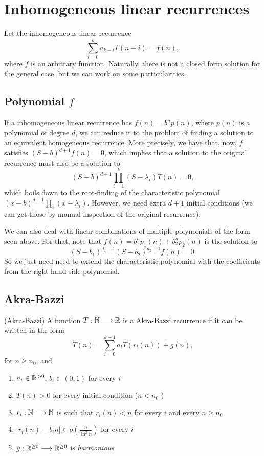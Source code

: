 \section*{Inhomogeneous linear recurrences}

Let the inhomogeneous linear recurrence \[
\sum_{i=0}^{k} a_{k-i}T(n-i) = f(n)
,\] where $f$ is an arbitrary function.
Naturally, there is not a closed form solution for the general case, but we can work on some particularities.

\subsection*{Polynomial $f$}

If a inhomogeneous linear recurrence has $f(n) = b^{n}p(n)$, where $p(n)$ is a polynomial of degree $d$, we can reduce it to the problem of finding a solution to an equivalent homogeneous recurrence.
More precisely, we have that, now, $f$ satisfies $(S-b)^{d+1}f(n) = 0$, which implies that a solution to the original recurrence must also be a solution to \[
    (S-b)^{d+1} \prod_{i=1}^{k} (S-\lambda_i) T(n) = 0 
,\] which boils down to the root-finding of the characteristic polynomial $(x-b)^{d+1} \prod_{i} (x-\lambda_i)$.
However, we need extra $d+1$ initial conditions (we can get those by manual inspection of the original recurrence).

\begin{note}
    We can also deal with linear combinations of multiple polynomials of the form seen above.
    For that, note that $f(n) = b_1^{n}p_1(n) + b_2^{n}p_2(n)$ is the solution to \[
	(S-b_1)^{d_1+1}(S-b_2)^{d_2+1}f(n) = 0
    .\] So we just need need to extend the characteristic polynomial with the coefficients from the right-hand side polynomial.
\end{note}

\subsection*{Akra-Bazzi}


\begin{definition}
    (Akra-Bazzi) A function $T: \mathbb{N} \longrightarrow \mathbb{R}$ is a Akra-Bazzi recurrence if it can be written in the form \[
    T(n) = \sum_{i=0}^{k-1} a_i T(r_i(n)) + g(n)
    ,\] for $n\ge n_0$, and
    \begin{enumerate}
        \item $a_i \in \mathbb{R}^{> 0}$, $b_i\in (0,1)$ for every $i$ 
	\item $T(n) > 0$ for every initial condition ($n < n_0$ )
	\item $r_i: \mathbb{N} \longrightarrow \mathbb{N}$ is such that $r_i(n) < n$ for every $i$ and every $n\ge n_0$ 
	\item $|r_i(n) - b_i n| \in o\left( \frac{n}{\ln^2 n} \right) $ for every $i$ 
	\item $g: \mathbb{R}^{\ge 0} \longrightarrow \mathbb{R}^{\ge 0}$ is \emph{harmonious}
    \end{enumerate}
\end{definition}

